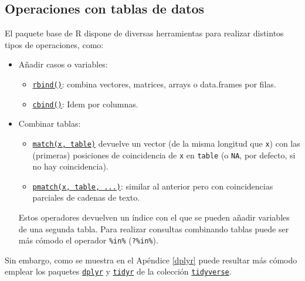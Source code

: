 \documentclass[
]{book}
\theoremstyle{break}
\theoremstyle{nonumberplain}
\begin{document}
\hypertarget{op-tablas}{%
\subsection{Operaciones con tablas de datos}\label{op-tablas}}

El paquete base de R dispone de diversas herramientas para realizar distintos tipos de operaciones, como:

\begin{itemize}
\item
  Añadir casos o variables:

  \begin{itemize}
  \item
    \href{https://www.rdocumentation.org/packages/base/versions/3.6.1/topics/rbind}{\texttt{rbind()}}: combina vectores, matrices, arrays o data.frames por filas.
  \item
    \href{https://www.rdocumentation.org/packages/base/versions/3.6.1/topics/cbind}{\texttt{cbind()}}: Idem por columnas.
  \end{itemize}
\item
  Combinar tablas:

  \begin{itemize}
  \item
    \href{https://www.rdocumentation.org/packages/base/versions/3.6.1/topics/match}{\texttt{match(x,\ table)}} devuelve un vector (de la misma longitud que \texttt{x}) con las (primeras) posiciones de coincidencia de \texttt{x} en \texttt{table} (o \texttt{NA}, por defecto, si no hay coincidencia).
  \item
    \href{https://www.rdocumentation.org/packages/base/versions/3.6.1/topics/pmatch}{\texttt{pmatch(x,\ table,\ ...)}}: similar al anterior pero con coincidencias parciales de cadenas de texto.
  \end{itemize}

  Estos operadores devuelven un índice con el que se pueden añadir variables de una segunda tabla. Para realizar consultas combinando tablas puede ser más cómodo el operador \texttt{\%in\%} (\texttt{?\textquotesingle{}\%in\%\textquotesingle{}}).
\end{itemize}

Sin embargo, como se muestra en el Apéndice \ref{dplyr} puede resultar más cómodo emplear los paquetes \href{https://dplyr.tidyverse.org}{\texttt{dplyr}} y \href{https://tidyr.tidyverse.org}{\texttt{tidyr}} de la colección \href{https://tidyverse.org}{\texttt{tidyverse}}.
\end{document}
